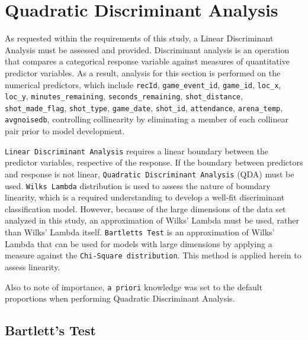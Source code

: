 \documentclass[american,]{article}
\begin{document}
\hypertarget{quadratic-discriminant-analysis}{%
\section{\texorpdfstring{\textbf{Quadratic Discriminant Analysis}}{Quadratic Discriminant Analysis}}\label{quadratic-discriminant-analysis}}

As requested within the requirements of this study, a Linear Discriminant Analysis must be assessed and provided. Discriminant analysis is an operation that compares a categorical response variable against measures of quantitative predictor variables. As a result, analysis for this section is performed on the numerical predictors, which include \texttt{recId}, \texttt{game\_event\_id}, \texttt{game\_id}, \texttt{loc\_x}, \texttt{loc\_y}, \texttt{minutes\_remaining}, \texttt{seconds\_remaining}, \texttt{shot\_distance}, \texttt{shot\_made\_flag}, \texttt{shot\_type}, \texttt{game\_date}, \texttt{shot\_id}, \texttt{attendance}, \texttt{arena\_temp}, \texttt{avgnoisedb}, controlling collinearity by eliminating a member of each collinear pair prior to model development.

\texttt{Linear\ Discriminant\ Analysis} requires a linear boundary between the predictor variables, respective of the response. If the boundary between predictors and response is not linear, \texttt{Quadratic\ Discriminant\ Analysis} (QDA) must be used. \texttt{Wilks\textquotesingle{}\ Lambda} distribution is used to assess the nature of boundary linearity, which is a required understanding to develop a well-fit discriminant classification model. However, because of the large dimensions of the data set analyzed in this study, an approximation of Wilks' Lambda must be used, rather than Wilks' Lambda itself. \texttt{Bartlett\textquotesingle{}s\ Test} is an approximation of Wilks' Lambda that can be used for models with large dimensions by applying a measure against the \texttt{Chi-Square\ distribution}. This method is applied herein to assess linearity.

Also to note of importance, \texttt{a\ priori} knowledge was set to the default proportions when performing Quadratic Discriminant Analysis.

\hypertarget{bartletts-test}{%
\subsection{\texorpdfstring{\textbf{Bartlett's Test}}{Bartlett's Test}}\label{bartletts-test}}
\end{document}
